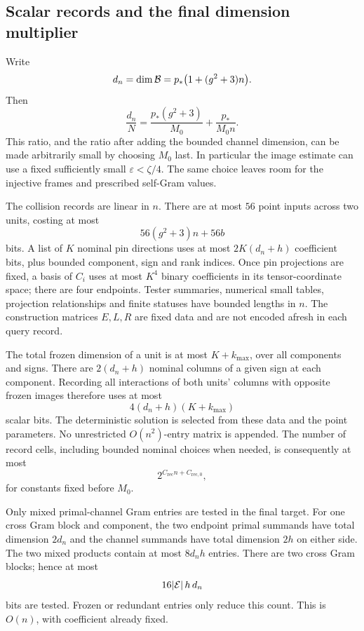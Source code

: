 \subsection{Scalar records and the final dimension multiplier}

Write
\begin{equation}
                  d_n=\dim\mathcal B=p_*\bigl(1+(g^2+3)n\bigr).
 \label{eq:ledger-column-dimension}
\end{equation}
Then
\[
       \frac{d_n}{N}
       =\frac{p_*(g^2+3)}{M_0}+\frac{p_*}{M_0n}.
\]
This ratio, and the ratio after adding the bounded channel dimension,
can be made arbitrarily small by choosing \(M_0\) last.
In particular the image estimate can use a fixed sufficiently small
\(\varepsilon<\zeta/4\). The same choice leaves room for the injective
frames and prescribed self-Gram values.

The collision records are linear in \(n\).
There are at most \(56\) point inputs across two units, costing at most
\[
                         56(g^2+3)n+56b
\]
bits. A list of \(K\) nominal pin directions uses at most
\(2K(d_n+h)\) coefficient bits, plus bounded component, sign and rank
indices.
Once pin projections are fixed, a basis of \(C_i\) uses at most
\(K^4\) binary coefficients in its tensor-coordinate space;
there are four endpoints.
Tester summaries, numerical small tables, projection relationships
and finite statuses have bounded lengths in \(n\).
The construction matrices \(E,L,R\) are fixed data and are not
encoded afresh in each query record.

The total frozen dimension of a unit is at most \(K+k_{\max}\),
over all components and signs.
There are \(2(d_n+h)\) nominal columns of a given sign at each
component. Recording all interactions of both units' columns with
opposite frozen images therefore uses at most
\[
                         4(d_n+h)(K+k_{\max})
\]
scalar bits.
The deterministic solution is selected from these data and the point
parameters. No unrestricted \(O(n^2)\)-entry matrix is appended.
The number of record cells, including bounded nominal choices when
needed, is consequently at most
\begin{equation}
                         2^{C_{\mathrm{rec}}n+C_{\mathrm{rec},0}},
 \label{eq:ledger-record-count}
\end{equation}
for constants fixed before \(M_0\).

Only mixed primal-channel Gram entries are tested in the final target.
For one cross Gram block and component, the two endpoint primal
summands have total dimension \(2d_n\) and the channel summands have
total dimension \(2h\) on either side. The two mixed products
contain at most \(8d_nh\) entries.
There are two cross Gram blocks; hence at most
\begin{equation}
                              16|\mathcal E|\,h\,d_n
 \label{eq:ledger-tested-gram-bits}
\end{equation}
bits are tested. Frozen or redundant entries only reduce this count.
This is \(O(n)\), with coefficient already fixed.

